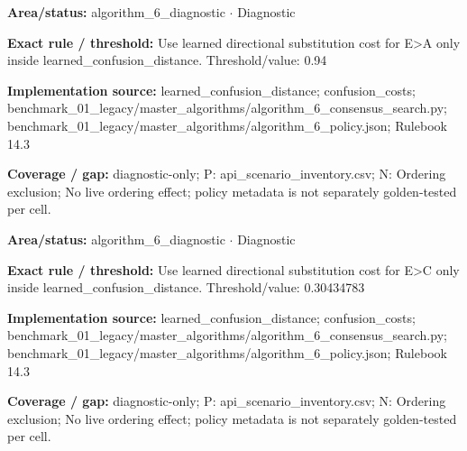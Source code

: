\begin{tcolorbox}[enhanced,breakable,colback=white,colframe=Muted!45,boxrule=0.45pt,arc=1.5pt,left=6pt,right=6pt,top=5pt,bottom=5pt,title={\texttt{A6-LEARNED-SUBSTITUTION-E-A}},title after break={\texttt{A6-LEARNED-SUBSTITUTION-E-A}\ (continued)},fonttitle=\headingfont\bfseries\color{Navy},coltitle=Navy]
\textbf{Area/status:} algorithm\_\allowbreak{}6\_\allowbreak{}diagnostic $\boldsymbol{\cdot}$ Diagnostic\par
\smallskip
\textbf{Exact rule / threshold:} Use learned directional substitution cost for E>A only inside learned\_\allowbreak{}confusion\_\allowbreak{}distance. Threshold/\allowbreak{}value: 0.94\par
\smallskip
\textbf{Implementation source:} learned\_\allowbreak{}confusion\_\allowbreak{}distance; confusion\_\allowbreak{}costs; benchmark\_\allowbreak{}01\_\allowbreak{}legacy/\allowbreak{}master\_\allowbreak{}algorithms/\allowbreak{}algorithm\_\allowbreak{}6\_\allowbreak{}consensus\_\allowbreak{}search.py; benchmark\_\allowbreak{}01\_\allowbreak{}legacy/\allowbreak{}master\_\allowbreak{}algorithms/\allowbreak{}algorithm\_\allowbreak{}6\_\allowbreak{}policy.json; Rulebook 14.3\par
\smallskip
\textbf{Coverage / gap:} diagnostic-only; P: api\_\allowbreak{}scenario\_\allowbreak{}inventory.csv; N: Ordering exclusion; No live ordering effect; policy metadata is not separately golden-tested per cell.
\end{tcolorbox}
\begin{tcolorbox}[enhanced,breakable,colback=white,colframe=Muted!45,boxrule=0.45pt,arc=1.5pt,left=6pt,right=6pt,top=5pt,bottom=5pt,title={\texttt{A6-LEARNED-SUBSTITUTION-E-C}},title after break={\texttt{A6-LEARNED-SUBSTITUTION-E-C}\ (continued)},fonttitle=\headingfont\bfseries\color{Navy},coltitle=Navy]
\textbf{Area/status:} algorithm\_\allowbreak{}6\_\allowbreak{}diagnostic $\boldsymbol{\cdot}$ Diagnostic\par
\smallskip
\textbf{Exact rule / threshold:} Use learned directional substitution cost for E>C only inside learned\_\allowbreak{}confusion\_\allowbreak{}distance. Threshold/\allowbreak{}value: 0.30434783\par
\smallskip
\textbf{Implementation source:} learned\_\allowbreak{}confusion\_\allowbreak{}distance; confusion\_\allowbreak{}costs; benchmark\_\allowbreak{}01\_\allowbreak{}legacy/\allowbreak{}master\_\allowbreak{}algorithms/\allowbreak{}algorithm\_\allowbreak{}6\_\allowbreak{}consensus\_\allowbreak{}search.py; benchmark\_\allowbreak{}01\_\allowbreak{}legacy/\allowbreak{}master\_\allowbreak{}algorithms/\allowbreak{}algorithm\_\allowbreak{}6\_\allowbreak{}policy.json; Rulebook 14.3\par
\smallskip
\textbf{Coverage / gap:} diagnostic-only; P: api\_\allowbreak{}scenario\_\allowbreak{}inventory.csv; N: Ordering exclusion; No live ordering effect; policy metadata is not separately golden-tested per cell.
\end{tcolorbox}
